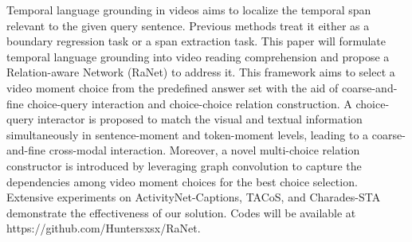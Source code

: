 Temporal language grounding in videos aims to localize the temporal span relevant to the given query sentence. Previous methods treat it either as a boundary regression task or a span extraction task. This paper will formulate temporal language grounding into video reading comprehension and propose a Relation-aware Network (RaNet) to address it. This framework aims to select a video moment choice from the predefined answer set with the aid of coarse-and-fine choice-query interaction and choice-choice relation construction. A choice-query interactor is proposed to match the visual and textual information simultaneously in sentence-moment and token-moment levels, leading to a coarse-and-fine cross-modal interaction. Moreover, a novel multi-choice relation constructor is introduced by leveraging graph convolution to capture the dependencies among video moment choices for the best choice selection. Extensive experiments on ActivityNet-Captions, TACoS, and Charades-STA demonstrate the effectiveness of our solution. Codes will be available at https://github.com/Huntersxsx/RaNet.
